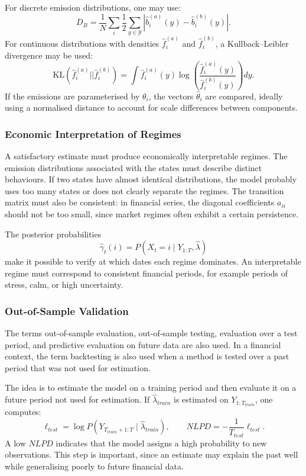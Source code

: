 \documentclass[11pt]{article}
\begin{document}
For discrete emission distributions, one may use:
\[
D_B=
\frac1N\sum_i
\frac12\sum_{y\in\mathcal{Y}}
\left|\widehat{b}^{(a)}_i(y)-\widehat{b}^{(b)}_i(y)\right|.
\]
For continuous distributions with densities \(\widehat f_i^{(a)}\) and \(\widehat f_i^{(b)}\), a Kullback--Leibler divergence may be used:
\[
\mathrm{KL}(\widehat f_i^{(a)}||\widehat f_i^{(b)})
=
\int \widehat f_i^{(a)}(y)
\log\left(
\frac{\widehat f_i^{(a)}(y)}
{\widehat f_i^{(b)}(y)}
\right)dy.
\]
If the emissions are parameterised by \(\theta_i\), the vectors \(\widehat{\theta}_i\) are compared, ideally using a normalised distance to account for scale differences between components.

\subsubsection{Economic Interpretation of Regimes}

A satisfactory estimate must produce economically interpretable regimes. The emission distributions associated with the states must describe distinct behaviours. If two states have almost identical distributions, the model probably uses too many states or does not clearly separate the regimes. The transition matrix must also be consistent: in financial series, the diagonal coefficients \(a_{ii}\) should not be too small, since market regimes often exhibit a certain persistence.

The posterior probabilities
\[
\widehat{\gamma}_t(i)=P(X_t=i\mid Y_{1:T},\widehat{\lambda})
\]
make it possible to verify at which dates each regime dominates. An interpretable regime must correspond to consistent financial periods, for example periods of stress, calm, or high uncertainty.

\subsubsection{Out-of-Sample Validation}

The terms out-of-sample evaluation, out-of-sample testing, evaluation over a test period, and predictive evaluation on future data are also used. In a financial context, the term backtesting is also used when a method is tested over a past period that was not used for estimation.

The idea is to estimate the model on a training period and then evaluate it on a future period not used for estimation. If \(\widehat{\lambda}_{train}\) is estimated on \(Y_{1:T_{train}}\), one computes:
\[
\ell_{test}
=
\log P(Y_{T_{train}+1:T}\mid \widehat{\lambda}_{train}),
\qquad
NLPD=-\frac{1}{T_{test}}\ell_{test}.
\]
A low \(NLPD\) indicates that the model assigns a high probability to new observations. This step is important, since an estimate may explain the past well while generalising poorly to future financial data.
\end{document}
